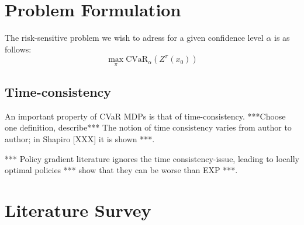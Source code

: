 
\section{Problem Formulation}\label{sec:prelim:problem}



The risk-sensitive problem we wish to adress for a given confidence level $\alpha$ is as follows:
\begin{equation}
\max_\pi \text{CVaR}_\alpha(Z^\pi(x_0))
\end{equation}


\subsection{Time-consistency}
An important property of CVaR MDPs is that of time-consistency. ***Choose one definition, describe*** The notion of time consistency varies from author to author; in Shapiro [XXX] it is shown ***.

*** Policy gradient literature ignores the time consistency-issue, leading to locally optimal policies *** show that they can be worse than EXP ***.



\section{Literature Survey}\label{sec:prelim:literature}


